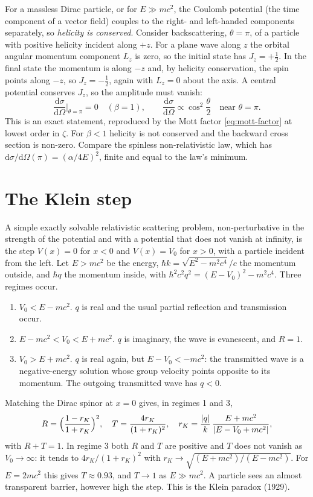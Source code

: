 \documentclass[11pt,a4paper]{book}
\numberwithin{equation}{chapter}
\newcommand{\dd}{\mathrm{d}}
\newcommand{\dsdO}{\frac{\dd\sigma}{\dd\Omega}}
\begin{document}
For a massless Dirac particle, or for $E\gg mc^2$, the Coulomb potential (the
time component of a vector field) couples to the right- and left-handed
components separately, so \emph{helicity is conserved}. Consider backscattering,
$\theta=\pi$, of a particle with positive helicity incident along $+z$. For a
plane wave along $z$ the orbital angular momentum component $L_z$ is zero, so
the initial state has $J_z=+\tfrac12$. In the final state the momentum is along
$-z$ and, by helicity conservation, the spin points along $-z$, so
$J_z=-\tfrac12$, again with $L_z=0$ about the axis. A central potential conserves
$J_z$, so the amplitude must vanish:
\begin{equation}\label{eq:backward}
  \dsdO\Big|_{\theta=\pi}=0\quad(\beta=1),\qquad
  \dsdO\propto\cos^2\frac\theta2\quad\text{near }\theta=\pi .
\end{equation}
This is an exact statement, reproduced by the Mott factor
\eqref{eq:mott-factor} at lowest order in $\zeta$. For $\beta<1$ helicity is not
conserved and the backward cross section is non-zero. Compare the spinless
non-relativistic law, which has $\dd\sigma/\dd\Omega(\pi)=(\alpha/4E)^2$, finite
and equal to the law's minimum.

\section{The Klein step}

A simple exactly solvable relativistic scattering problem, non-perturbative in
the strength of the potential and with a potential that does not vanish at
infinity, is the step $V(x)=0$ for $x<0$ and $V(x)=V_0$ for $x>0$, with a
particle incident from the left. Let $E>mc^2$ be the energy,
$\hbar k=\sqrt{E^2-m^2c^4}/c$ the momentum outside, and $\hbar q$ the momentum
inside, with $\hbar^2c^2q^2=(E-V_0)^2-m^2c^4$. Three regimes occur.
\begin{enumerate}
  \item $V_0<E-mc^2$. $q$ is real and the usual partial reflection and
        transmission occur.
  \item $E-mc^2<V_0<E+mc^2$. $q$ is imaginary, the wave is evanescent, and
        $R=1$.
  \item $V_0>E+mc^2$. $q$ is real again, but $E-V_0<-mc^2$: the transmitted wave
        is a negative-energy solution whose group velocity points opposite to its
        momentum. The outgoing transmitted wave has $q<0$.
\end{enumerate}
Matching the Dirac spinor at $x=0$ gives, in regimes 1 and 3,
\begin{equation}\label{eq:klein}
  R=\Bigl(\frac{1-r_K}{1+r_K}\Bigr)^{2},\quad
  T=\frac{4r_K}{(1+r_K)^2},\quad
  r_K=\frac{|q|}{k}\,\frac{E+mc^2}{|E-V_0+mc^2|},
\end{equation}
with $R+T=1$. In regime 3 both $R$ and $T$ are positive and $T$ does not vanish as
$V_0\to\infty$: it tends to $4r_K/(1+r_K)^2$ with
$r_K\to\sqrt{(E+mc^2)/(E-mc^2)}$. For $E=2mc^2$ this gives $T\approx0.93$, and
$T\to1$ as $E\gg mc^2$. A particle sees an almost transparent barrier, however
high the step. This is the Klein paradox (1929).
\end{document}
